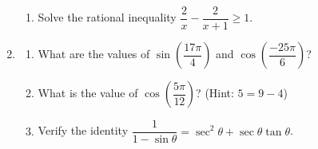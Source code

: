\documentclass[12pt]{article}
\newcommand{\points}[1]{\marginpar{\hspace{24pt}[#1]}}
\begin{document}
\begin{enumerate}
\begin{enumerate}
 \item Solve the rational inequality $\dfrac{2}{x}-\dfrac{2}{x+1}\geq 1$. \points{4} 
\end{enumerate}

\newpage

\item \begin{enumerate}
       \item What are the values of $\sin\left(\dfrac{17\pi}{4}\right)$ and $\cos\left(\dfrac{-25\pi}{6}\right)$? \points{2}

\vspace{1.5in}

 \item What is the value of $\cos\left(\dfrac{5\pi}{12}\right)$? (Hint: $5=9-4$)\points{4}




 


\vspace{3in}

\item Verify the identity $\dfrac{1}{1-\sin\theta} = \sec^2\theta+\sec\theta\tan\theta$. \points{4}
      \end{enumerate}


\end{enumerate}
\newpage
\end{document}
